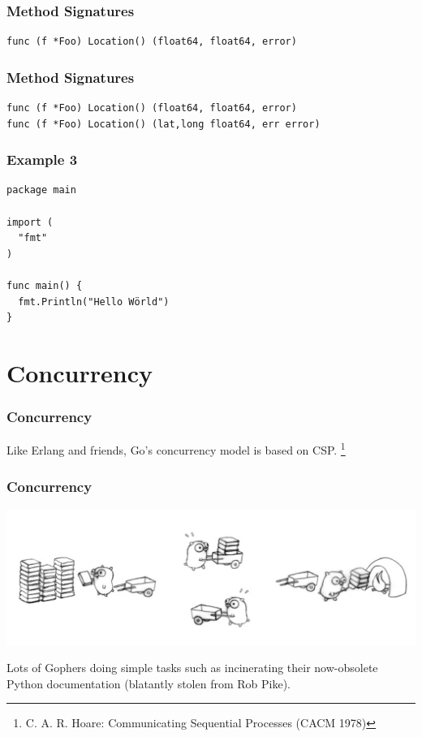 \documentclass[xelatex,aspectratio=169]{beamer}
\begin{document}
{
\begin{frame}[fragile]
	\frametitle{Method Signatures}
\begin{verbatim}
func (f *Foo) Location() (float64, float64, error)
\end{verbatim}
\end{frame}

\begin{frame}[fragile]
	\frametitle{Method Signatures}
\begin{verbatim}
func (f *Foo) Location() (float64, float64, error)
func (f *Foo) Location() (lat,long float64, err error)
\end{verbatim}
\end{frame}
}

\begin{frame}[fragile]
	\frametitle{Example  3}
\begin{verbatim}
package main

import (
  "fmt"
)

func main() {
  fmt.Println("Hello Wörld")
}
\end{verbatim}
\end{frame}

\section[]{Concurrency}
\frame{\sectionpage}

\begin{frame}
	\frametitle{Concurrency}
	\let\thefootnote\relax

	\begin{flushleft}
		Like Erlang and friends, Go's concurrency model is based on CSP.
		\footnote{C. A. R. Hoare: Communicating Sequential Processes (CACM 1978)}
	\end{flushleft}

\end{frame}

\begin{frame}
	\frametitle{Concurrency}
	\centerline{\includegraphics{images/gophercomplex1.jpg}}
	\begin{flushleft}
		Lots of Gophers doing simple tasks such as incinerating their now-obsolete
		Python documentation (blatantly stolen from Rob Pike).\\
	\end{flushleft}
\end{frame}
\end{document}
